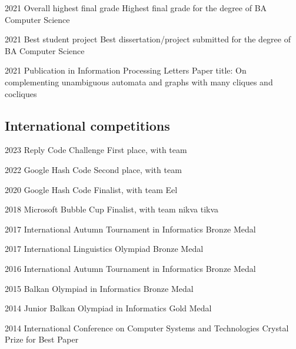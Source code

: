 \documentclass{tccv}
\begin{document}
\begin{yearlist}

\item{2021}
     {Overall highest final grade}
     {Highest final grade for the degree of BA Computer Science}

\item{2021}
     {Best student project}
     {Best dissertation/project submitted for the degree of BA Computer Science}

\item{2021}
     {Publication in Information Processing Letters}
     {Paper title: On complementing unambiguous automata
     and graphs with many cliques and cocliques}

\end{yearlist}

\subsection{International competitions}

\begin{yearlist}

\item{2023}
     {Reply Code Challenge}
     {First place, with team  {}}

\item{2022}
     {Google Hash Code}
     {Second place, with team }

\item{2020}
     {Google Hash Code}
     {Finalist, with team Eel}

\item{2018}
     {Microsoft Bubble Cup}
     {Finalist, with team nikva tikva}

\item{2017}
     {International Autumn Tournament in Informatics}
     {Bronze Medal}

\item{2017}
     {International Linguistics Olympiad}
     {Bronze Medal}

\item{2016}
     {International Autumn Tournament in Informatics}
     {Bronze Medal}

\item{2015}
     {Balkan Olympiad in Informatics}
     {Bronze Medal}

\item{2014}
     {Junior Balkan Olympiad in Informatics}
     {Gold Medal}

\item{2014}
     {International Conference on Computer Systems and Technologies}
     {Crystal Prize for Best Paper}

\end{yearlist}
\end{document}
